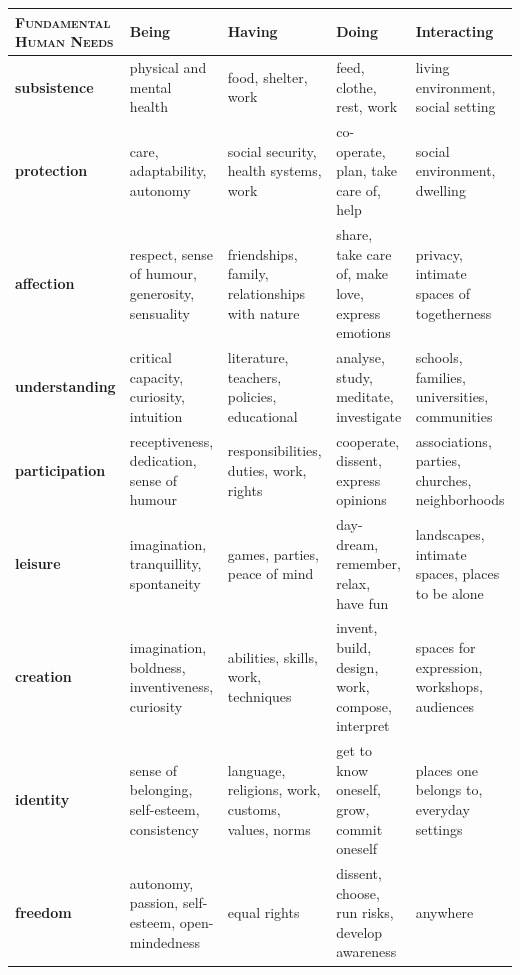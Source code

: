 \documentclass[letter,11pt]{article}
\begin{document}
\begin{enumerate}
\begin{center}
  \small
	\begin{tabular}{>{\centering\bfseries}m{}*{4}{>{\centering}m{}}}
		\textsc{Fundamental Human Needs} & \bfseries Being & \bfseries Having & \bfseries Doing & \bfseries Interacting \tabularnewline\toprule
subsistence &
physical and mental health &
food, shelter, work &
feed, clothe, rest, work &
living environment, social setting \tabularnewline\midrule
protection &
care, adaptability, autonomy &
social security, health systems, work &
co-operate, plan, take care of, help &
social environment, dwelling \tabularnewline\midrule
affection &
respect, sense of humour, generosity, sensuality &
friendships, family, relationships with nature &
share, take care of, make love, express emotions &
privacy, intimate spaces of togetherness \tabularnewline\midrule
understanding &
critical capacity, curiosity, intuition &
literature, teachers, policies, educational &
analyse, study, meditate, investigate &
schools, families, universities, communities \tabularnewline\midrule
participation &
receptiveness, dedication, sense of humour &
responsibilities, duties, work, rights &
cooperate, dissent, express opinions &
associations, parties, churches, neighborhoods \tabularnewline\midrule
leisure         &
imagination, tranquillity, spontaneity  &
games, parties, peace of mind &
day-dream, remember, relax, have fun &
landscapes, intimate spaces, places to be alone \tabularnewline\midrule
creation &
imagination, boldness, inventiveness, curiosity &
abilities, skills, work, techniques &
invent, build, design, work, compose, interpret &
spaces for expression, workshops, audiences \tabularnewline\midrule
identity &
sense of belonging, self-esteem, consistency &
language, religions, work, customs, values, norms &
get to know oneself, grow, commit oneself &
places one belongs to, everyday settings \tabularnewline\midrule
freedom &
autonomy, passion, self-esteem, open-mindedness  &
equal rights &
dissent, choose, run risks, develop awareness &
anywhere \tabularnewline\midrule
\end{tabular}
\end{center}
\end{enumerate}
 
\end{document}
